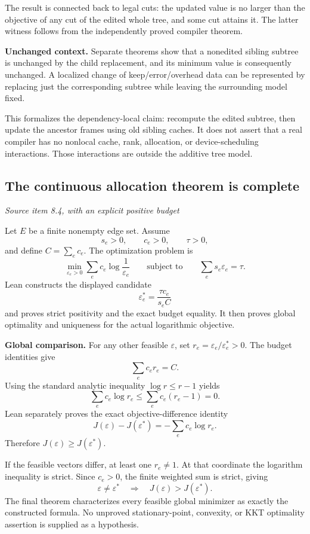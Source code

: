 The result is connected back to legal cuts: the updated value is no larger than the objective of any cut of the edited whole tree, and some cut attains it. The latter witness follows from the independently proved compiler theorem.

\textbf{Unchanged context.} Separate theorems show that a nonedited sibling subtree is unchanged by the child replacement, and its minimum value is consequently unchanged. A localized change of keep/error/overhead data can be represented by replacing just the corresponding subtree while leaving the surrounding model fixed.

This formalizes the dependency-local claim: recompute the edited subtree, then update the ancestor frames using old sibling caches. It does not assert that a real compiler has no nonlocal cache, rank, allocation, or device-scheduling interactions. Those interactions are outside the additive tree model.



\subsection{The continuous allocation theorem is complete}\label{supp2:subsection:004}\textit{Source item 8.4, with an explicit positive budget}\par
Let $E$ be a finite nonempty edge set. Assume
\[
s_e>0,\qquad c_e>0,\qquad \tau>0,
\]
and define $C=\sum_ec_e$. The optimization problem is
\[
\min_{\varepsilon_e>0}\sum_ec_e\log\frac1{\varepsilon_e}
\qquad\text{subject to}\qquad
\sum_es_e\varepsilon_e=\tau.
\]
Lean constructs the displayed candidate
\[
\boxed{\varepsilon_e^*=\frac{\tau c_e}{s_eC}}
\]
and proves strict positivity and the exact budget equality. It then proves global optimality and uniqueness for the actual logarithmic objective.

\textbf{Global comparison.} For any other feasible $\varepsilon$, set
$r_e=\varepsilon_e/\varepsilon_e^*>0$. The budget identities give
\[
\sum_ec_er_e=C.
\]
Using the standard analytic inequality $\log r\leq r-1$ yields
\[
\sum_ec_e\log r_e\leq\sum_ec_e(r_e-1)=0.
\]
Lean separately proves the exact objective-difference identity
\[
J(\varepsilon)-J(\varepsilon^*)=-\sum_ec_e\log r_e.
\]
Therefore $J(\varepsilon)\geq J(\varepsilon^*)$.

If the feasible vectors differ, at least one $r_e\ne1$. At that coordinate the logarithm inequality is strict. Since $c_e>0$, the finite weighted sum is strict, giving
\[
\varepsilon\ne\varepsilon^*\quad\Longrightarrow\quad
J(\varepsilon)>J(\varepsilon^*).
\]
The final theorem characterizes every feasible global minimizer as exactly the constructed formula. No unproved stationary-point, convexity, or KKT optimality assertion is supplied as a hypothesis.


